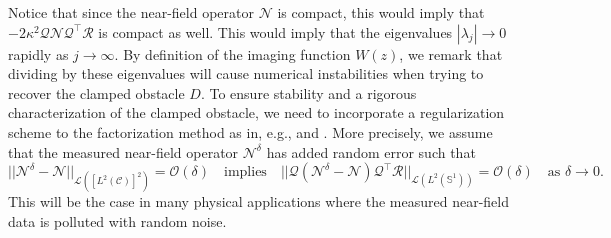 \documentclass{article}
\begin{document}
Notice that since the near-field operator $\mathcal N$ is compact, this would imply that $-2\kappa^2\mathcal Q\mathcal N\mathcal Q^\top\mathcal R$ is compact as well. This would imply that the eigenvalues $|\lambda_j|\to 0$ rapidly as $j\to\infty$. By definition of the imaging function $W(z)$, we remark that dividing by these eigenvalues will cause numerical instabilities when trying to recover the clamped obstacle $D$. To ensure stability and a rigorous characterization of the clamped obstacle, we need to incorporate a regularization scheme to the factorization method as in, e.g., \cite{audibert2014lsm} and \cite{harris2023rfm}. More precisely, we assume that the measured near-field operator $\mathcal N^\delta$ has added random error such that
\[
||\mathcal N^\delta -\mathcal N||_{\mathcal L([L^2(\mathcal C)]^2)}=\mathcal O(\delta) \quad \text{implies}\quad ||\mathcal Q(\mathcal N^\delta-\mathcal N)\mathcal Q^\top \mathcal R||_{\mathcal L(L^2(\mathbb S^1))}=\mathcal O(\delta)\quad \text{as }\delta\to 0.
\]
This will be the case in many physical applications where the measured near-field data is polluted with random noise.
\end{document}
